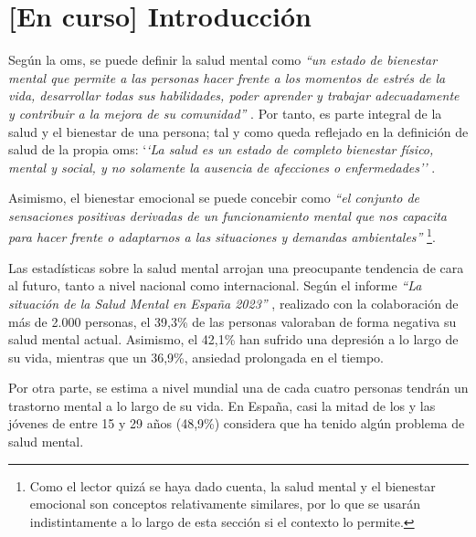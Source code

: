 \chapter{[En curso] Introducción}
\label{chapter:introduccion}



Según la \gls{oms}, se puede definir la salud mental como \textit{``un estado de bienestar mental que permite a las personas hacer frente a los momentos de estrés de la vida, desarrollar todas sus habilidades, poder aprender y trabajar adecuadamente y contribuir a la mejora de su comunidad''} \cite{oms_salud_2022}. Por tanto, es parte integral de la salud y el bienestar de una persona; tal y como queda reflejado en la definición de salud de la propia \gls{oms}: `\textit{`La salud es un estado de completo bienestar físico, mental y social, y no solamente la ausencia de afecciones o enfermedades''} \cite{feafes_galicia_que_nodate}.

Asimismo, el bienestar emocional se puede concebir como \textit{``el conjunto de sensaciones positivas derivadas de un funcionamiento mental que nos capacita para hacer frente o adaptarnos a las situaciones y demandas ambientales''} \cite{morer_linan_que_2019}  \footnote{Como el lector quizá se haya dado cuenta, la salud mental y el bienestar emocional son conceptos relativamente similares, por lo que se usarán indistintamente a lo largo de esta sección si el contexto lo permite.}.

Las estadísticas sobre la salud mental arrojan una preocupante tendencia de cara al futuro, tanto a nivel nacional como internacional. Según el informe \textit{``La situación de la Salud Mental en España 2023''} \cite{comunicacion_cuatro_2023}, realizado con la colaboración de más de 2.000 personas, el 39,3\% de las personas valoraban de forma negativa su salud mental actual. Asimismo, el 42,1\% han sufrido una depresión a lo largo de su vida, mientras que un 36,9\%, ansiedad prolongada en el tiempo. 

Por otra parte, se estima a nivel mundial una de cada cuatro personas tendrán un trastorno mental a lo largo de su vida. En España, casi la mitad de los y las jóvenes de entre 15 y 29 años (48,9\%) considera que ha tenido algún problema de salud mental.

